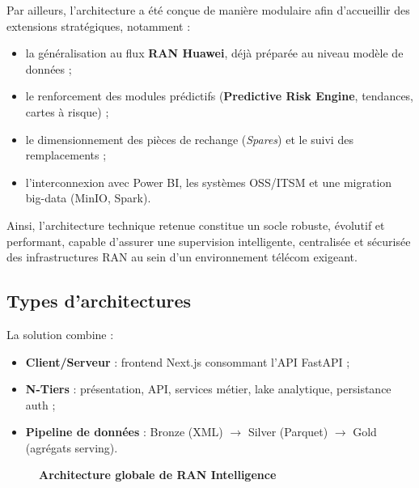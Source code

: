 \documentclass[12pt,a4paper]{report}
\begin{document}
\begin{flushleft}
Par ailleurs, l'architecture a été conçue de manière modulaire afin d'accueillir des extensions stratégiques, notamment :

\begin{itemize}
    \item la généralisation au flux \textbf{RAN Huawei}, déjà préparée au niveau modèle de données ;
    \item le renforcement des modules prédictifs (\textbf{Predictive Risk Engine}, tendances, cartes à risque) ;
    \item le dimensionnement des pièces de rechange (\textit{Spares}) et le suivi des remplacements ;
    \item l'interconnexion avec Power BI, les systèmes OSS/ITSM et une migration big-data (MinIO, Spark).
\end{itemize}

Ainsi, l'architecture technique retenue constitue un socle robuste, évolutif et performant, capable d'assurer une supervision intelligente, centralisée et sécurisée des infrastructures RAN au sein d'un environnement télécom exigeant.

\end{flushleft}

\vspace{0.5cm}

\subsection{Types d'architectures}\label{sec:ch2-types}
La solution combine :
\begin{itemize}[leftmargin=*,itemsep=2pt]
    \item \textbf{Client/Serveur} : frontend Next.js consommant l'API FastAPI ;
    \item \textbf{N-Tiers} : présentation, API, services métier, lake analytique, persistance auth ;
    \item \textbf{Pipeline de données} : Bronze (XML) $\rightarrow$ Silver (Parquet) $\rightarrow$ Gold (agrégats serving).
\end{itemize}

\begin{figure}[H]\centering
{}
\caption{\textbf{Architecture globale de RAN Intelligence}}
\label{fig:global_architecture_ran}
\end{figure}
\end{document}
